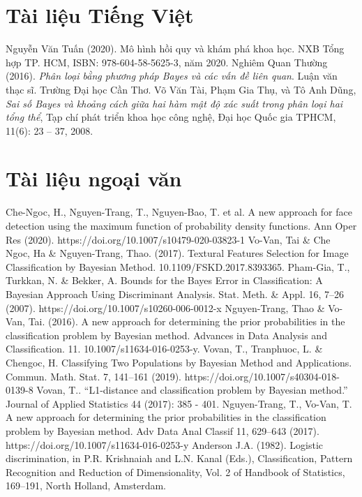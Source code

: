 \documentclass[a4paper,oneside]{report}			%
\theoremstyle{plain} %
\theoremstyle{plain} %
\theoremstyle{nonumberplain} %
\begin{document}
\begin{thebibliography}{10}
	
	\section*{Tài liệu Tiếng Việt}

 Nguyễn Văn Tuấn (2020). Mô hình hồi quy và khám phá khoa học. NXB Tổng hợp TP. HCM, ISBN: 978-604-58-5625-3, năm 2020.
 Nghiêm Quan Thường (2016). \textit{Phân loại bằng phương pháp Bayes và các vấn đề liên quan}. Luận văn thạc sĩ. Trường Đại học Cần Thơ.
 Võ Văn Tài, Phạm  Gia  Thụ, và Tô Anh Dũng, \textit{Sai  số  Bayes  và  khoảng cách  giữa  hai hàm  mật độ xác suất trong phân loại hai tổng thể}, Tạp chí phát  triển khoa  học công nghệ, Đại học Quốc gia TPHCM, 11(6): 23 – 37, 2008. 

	\section*{Tài liệu ngoại văn}	
 Che-Ngoc, H., Nguyen-Trang, T., Nguyen-Bao, T. et al. A new approach for face detection using the maximum function of probability density functions. Ann Oper Res (2020). https://doi.org/10.1007/s10479-020-03823-1
 Vo-Van, Tai \& Che Ngoc, Ha \& Nguyen-Trang, Thao. (2017). Textural Features Selection for Image Classification by Bayesian Method. 10.1109/FSKD.2017.8393365.
 Pham-Gia, T., Turkkan, N. \& Bekker, A. Bounds for the Bayes Error in Classification: A Bayesian Approach Using Discriminant Analysis. Stat. Meth. \& Appl. 16, 7–26 (2007). https://doi.org/10.1007/s10260-006-0012-x
 Nguyen-Trang, Thao \& Vo-Van, Tai. (2016). A new approach for determining the prior probabilities in the classification problem by Bayesian method. Advances in Data Analysis and Classification. 11. 10.1007/s11634-016-0253-y. 
 Vovan, T., Tranphuoc, L. \& Chengoc, H. Classifying Two Populations by Bayesian Method and Applications. Commun. Math. Stat. 7, 141–161 (2019). https://doi.org/10.1007/s40304-018-0139-8
 Vovan, T.. “L1-distance and classification problem by Bayesian method.” Journal of Applied Statistics 44 (2017): 385 - 401.
 Nguyen-Trang, T., Vo-Van, T. A new approach for determining the prior probabilities in the classification problem by Bayesian method. Adv Data Anal Classif 11, 629–643 (2017). https://doi.org/10.1007/s11634-016-0253-y
 Anderson J.A. (1982). Logistic discrimination, in P.R. Krishnaiah and L.N. Kanal (Eds.), Classification, Pattern Recognition and Reduction of Dimensionality, Vol. 2 of Handbook of Statistics, 169–191, North Holland, Amsterdam.
\end{thebibliography}

%
%
\printindex
\end{document}
